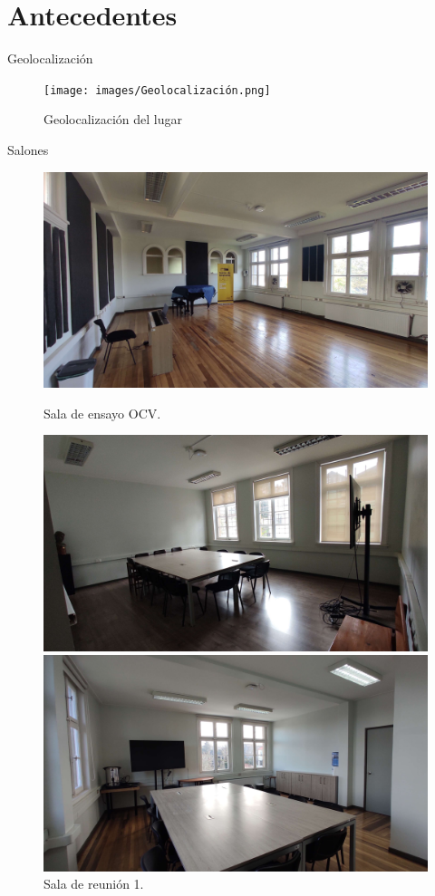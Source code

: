 \documentclass{sintefbeamer}
\begin{document}
\section{Antecedentes}
\begin{frame}{Geolocalización}
    \begin{figure}
        \centering
        \texttt{[image: images/Geolocalización.png]}
        \caption{Geolocalización del lugar}
        \label{fig: geolocalización}
    \end{figure}
\end{frame}
\begin{frame}{Salones}
    \begin{figure}[!htb]
  \includegraphics[width=\linewidth]{images/Fotos recinto/Sala OCV.jpg}
  \caption{Sala de ensayo OCV.}\label{fig:sala-ensayo}
\endminipage\hfill
{}
  \includegraphics[width=\linewidth]{images/Fotos recinto/Sala 1.jpg}
  \caption{Sala de reunión 1.}\label{fig:sala-reunion1}
\endminipage\hfill
{}%
  \includegraphics[width=\linewidth]{images/Fotos recinto/Sala 2.jpg}

\end{figure}
\end{frame}
\end{document}
